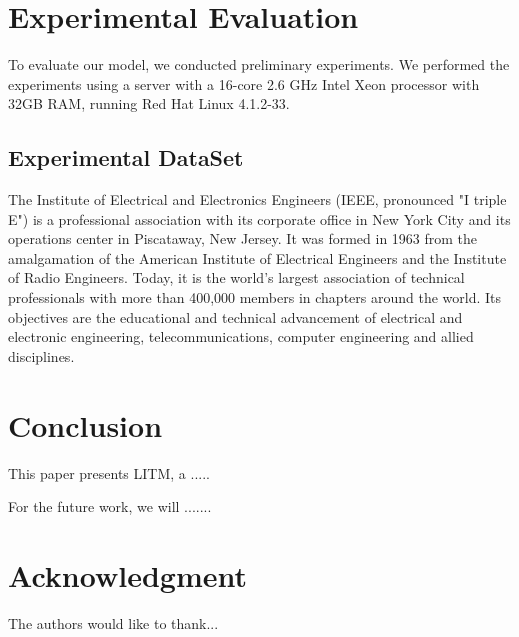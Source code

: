 \documentclass[conference]{IEEEtran}
\begin{document}
\section{Experimental Evaluation} \label{sec:experiment}

To evaluate our model, we conducted preliminary experiments. We performed the experiments using a server with a 16-core 2.6 GHz Intel Xeon processor with 32GB RAM, running Red Hat Linux 4.1.2-33.

\subsection{Experimental DataSet}
The Institute of Electrical and Electronics Engineers (IEEE, pronounced "I triple E") is a professional association with its corporate office in New York City and its operations center in Piscataway, New Jersey. It was formed in 1963 from the amalgamation of the American Institute of Electrical Engineers and the Institute of Radio Engineers. Today, it is the world's largest association of technical professionals with more than 400,000 members in chapters around the world. Its objectives are the educational and technical advancement of electrical and electronic engineering, telecommunications, computer engineering and allied disciplines.

\section{Conclusion}\label{sec:conclusion}
This paper presents LITM, a .....

For the future work, we will .......


\section*{Acknowledgment}


The authors would like to thank...













\end{document}
